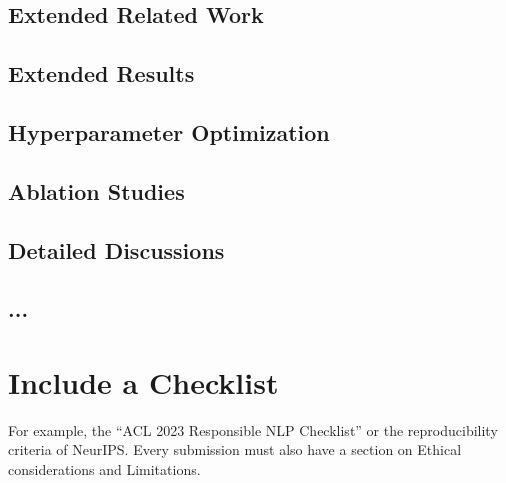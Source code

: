 \documentclass[sigconf, review, nonacm]{acmart}
\begin{document}

\subsection{Extended Related Work}
\label{appendix:extendedrelatedwork}

\subsection{Extended Results}
\label{appendix:extendedresults}

\subsection{Hyperparameter Optimization}
\label{appendix:hyperparameteroptimization}

\subsection{Ablation Studies}
\label{appendix:ablationstudies}

\subsection{Detailed Discussions}
\label{appendix:detaileddiscussion}

\subsection{...}




\section{Include a Checklist}


For example, the ``ACL 2023 Responsible NLP Checklist'' or the reproducibility criteria of NeurIPS.
Every submission must also have a section on Ethical considerations and Limitations.
\end{document}
